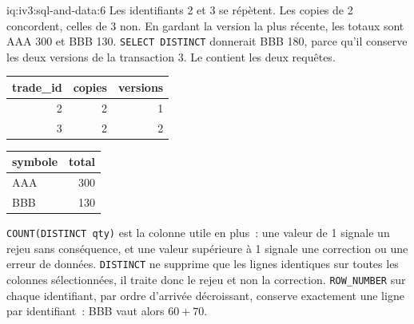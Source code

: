 \begin{solution}{iq:iv3:sql-and-data:6}
Les identifiants 2 et 3 se répètent. Les copies de 2 concordent, celles de 3 non. En gardant la version la plus récente, les totaux sont AAA 300 et BBB 130. \texttt{SELECT DISTINCT} donnerait BBB 180, parce qu'il conserve les deux versions de la transaction 3. Le  contient les deux requêtes.
\label{lst:iv3:sq:dup}
\begin{center}\small
\begin{tabular}{rrr}
trade\_id & copies & versions\\\hline
2 & 2 & 1\\
3 & 2 & 2
\end{tabular}\qquad
\begin{tabular}{lr}
symbole & total\\\hline
AAA & 300\\
BBB & 130
\end{tabular}
\end{center}
\texttt{COUNT(DISTINCT qty)} est la colonne utile en plus~: une valeur de 1 signale un rejeu sans conséquence, et une valeur supérieure à 1 signale une correction ou une erreur de données. \texttt{DISTINCT} ne supprime que les lignes identiques sur toutes les colonnes sélectionnées, il traite donc le rejeu et non la correction. \texttt{ROW\_NUMBER} sur chaque identifiant, par ordre d'arrivée décroissant, conserve exactement une ligne par identifiant~: BBB vaut alors $60 + 70$.

\end{solution}

